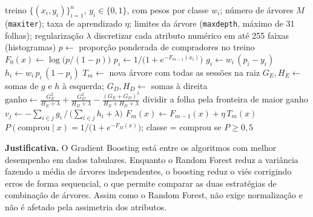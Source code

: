 \documentclass[11pt,a4paper]{article}
\DeclareRobustCommand{\atr}[1]{{\renewcommand{\_}{\textunderscore\allowbreak}\texttt{#1}}}
\begin{document}
\begin{algorithm}[H]
  \caption{Gradient Boosting com histogramas para classificação binária}
  \label{alg:gb}
  \small
  \begin{algorithmic}[1]
    \Require treino $\{(x_i, y_i)\}_{i=1}^{n}$, $y_i \in \{0,1\}$, com pesos por classe $w_i$; número de árvores $M$
             (\atr{max\_iter}); taxa de aprendizado $\eta$; limites da árvore (\atr{max\_depth}, máximo de 31
             folhas); regularização $\lambda$
    \State discretizar cada atributo numérico em até 255 faixas (histogramas)
    \State $p \gets$ proporção ponderada de compradores no treino
    \State $F_0(x) \gets \log\big(p / (1-p)\big)$ 
        \State $p_i \gets 1 / \big(1 + e^{-F_{m-1}(x_i)}\big)$ 
        \State $g_i \gets w_i\,(p_i - y_i)$ 
        \State $h_i \gets w_i\,p_i\,(1 - p_i)$ 
      \EndFor
      \State $T_m \gets$ nova árvore com todas as sessões na raiz
          \State $G_E, H_E \gets$ somas de $g$ e $h$ à esquerda; \quad $G_D, H_D \gets$ somas à direita
          \State $\text{ganho} \gets \frac{G_E^2}{H_E+\lambda} + \frac{G_D^2}{H_D+\lambda} -
                 \frac{(G_E+G_D)^2}{H_E+H_D+\lambda}$
        \EndFor
        \State dividir a folha pela fronteira de maior ganho
      \EndWhile
        \State $v_j \gets -\sum_{i \in j} g_i \,/\, \big(\sum_{i \in j} h_i + \lambda\big)$
      \EndFor
      \State $F_m(x) \gets F_{m-1}(x) + \eta\,T_m(x)$ 
    \EndFor
    \Ensure $P(\text{comprou} \mid x) = 1/\big(1 + e^{-F_M(x)}\big)$; classe = comprou se $P \ge 0{,}5$
  \end{algorithmic}
\end{algorithm}

\textbf{Justificativa.} O Gradient Boosting está entre os algoritmos com melhor desempenho em dados tabulares.
Enquanto o Random Forest reduz a variância fazendo a média de árvores independentes, o boosting reduz o viés
corrigindo erros de forma sequencial, o que permite comparar as duas estratégias de combinação de árvores. Assim como
o Random Forest, não exige normalização e não é afetado pela assimetria dos atributos.
\end{document}
